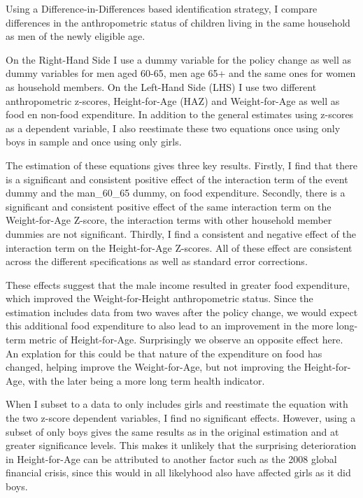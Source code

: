 \documentclass[a4paper,british]{article}\usepackage[]{graphicx}\usepackage[]{color}
\begin{document}
Using a Difference-in-Differences based identification strategy, I
compare differences in the anthropometric status of children living
in the same household as men of the newly eligible age.

On the Right-Hand Side I use a dummy variable for the policy change
as well as dummy variables for men aged 60-65, men age 65+ and the
same ones for women as household members. On the Left-Hand Side (LHS)
I use two different anthropometric z-scores, Height-for-Age (HAZ)
and Weight-for-Age as well as food en non-food expenditure. In addition
to the general estimates using z-scores as a dependent variable, I
also reestimate these two equations once using only boys in sample
and once using only girls.

The estimation of these equations gives three key results. Firstly,
I find that there is a significant and consistent positive effect
of the interaction term of the event dummy and the man\_60\_65 dummy,
on food expenditure. Secondly, there is a significant and consistent
positive effect of the same interaction term on the Weight-for-Age
Z-score, the interaction terms with other household member dummies
are not significant. Thirdly, I find a consistent and negative effect
of the interaction term on the Height-for-Age Z-scores. All of these
effect are consistent across the different specifications as well
as standard error corrections.

These effects suggest that the male income resulted in greater food
expenditure, which improved the Weight-for-Height anthropometric status.
Since the estimation includes data from two waves after the policy
change, we would expect this additional food expenditure to also lead
to an improvement in the more long-term metric of Height-for-Age.
Surprisingly we observe an opposite effect here. An explation for
this could be that nature of the expenditure on food has changed,
helping improve the Weight-for-Age, but not improving the Height-for-Age,
with the later being a more long term health indicator.

When I subset to a data to only includes girls and reestimate the
equation with the two z-score dependent variables, I find no significant
effects. However, using a subset of only boys gives the same results
as in the original estimation and at greater significance levels.
This makes it unlikely that the surprising deterioration in Height-for-Age
can be attributed to another factor such as the 2008 global financial
crisis, since this would in all likelyhood also have affected girls
as it did boys.
\end{document}
